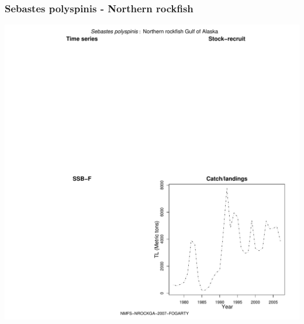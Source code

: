 \subsubsection{Sebastes polyspinis - Northern rockfish}
\begin{center}
\includegraphics[width=1.2\textwidth]{../R/figures/NMFS-NROCKGA-2007-FOGARTY.pdf}
\end{center}

